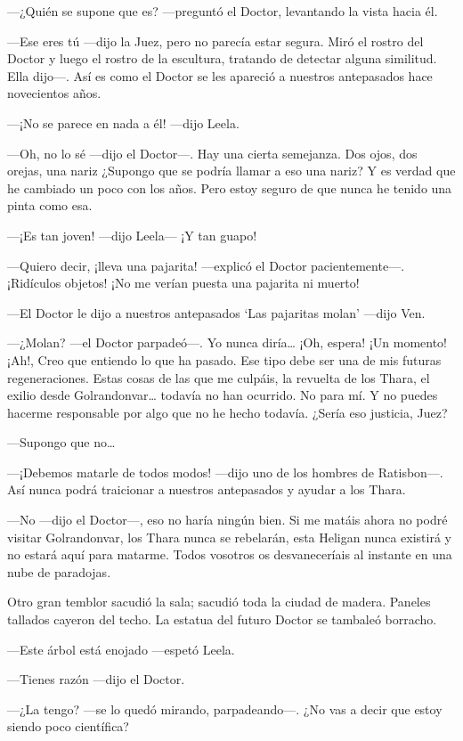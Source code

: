 ---¿Quién se supone que es? ---preguntó el Doctor, levantando la vista
hacia él.

---Ese eres tú ---dijo la Juez, pero no parecía estar segura. Miró el
rostro del Doctor y luego el rostro de la escultura, tratando de
detectar alguna similitud. Ella dijo---. Así es como el Doctor se les
apareció a nuestros antepasados hace novecientos años.

---¡No se parece en nada a él! ---dijo Leela.

---Oh, no lo sé ---dijo el Doctor---. Hay una cierta semejanza. Dos
ojos, dos orejas, una nariz ¿Supongo que se podría llamar a eso una
nariz? Y es verdad que he cambiado un poco con los años. Pero estoy
seguro de que nunca he tenido una pinta como esa.

---¡Es tan joven! ---dijo Leela--- ¡Y tan guapo!

---Quiero decir, ¡lleva una pajarita! ---explicó el Doctor
pacientemente---. ¡Ridículos objetos! ¡No me verían puesta una pajarita
ni muerto!

---El Doctor le dijo a nuestros antepasados `Las pajaritas molan'
---dijo Ven.

---¿Molan? ---el Doctor parpadeó---. Yo nunca diría\ldots{} ¡Oh, espera!
¡Un momento! ¡Ah!, Creo que entiendo lo que ha pasado. Ese tipo debe ser
una de mis futuras regeneraciones. Estas cosas de las que me culpáis, la
revuelta de los Thara, el exilio desde Golrandonvar\ldots{} todavía no
han ocurrido. No para mí. Y no puedes hacerme responsable por algo que
no he hecho todavía. ¿Sería eso justicia, Juez?

---Supongo que no\ldots{}

---¡Debemos matarle de todos modos! ---dijo uno de los hombres de
Ratisbon---. Así nunca podrá traicionar a nuestros antepasados y
ayudar a los Thara.

---No ---dijo el Doctor---, eso no haría ningún bien. Si me matáis ahora
no podré visitar Golrandonvar, los Thara nunca se rebelarán, esta
Heligan nunca existirá y no estará aquí para matarme. Todos vosotros os
desvaneceríais al instante en una nube de paradojas.

Otro gran temblor sacudió la sala; sacudió toda la ciudad de madera.
Paneles tallados cayeron del techo. La estatua del futuro Doctor se
tambaleó borracho.

---Este árbol está enojado ---espetó Leela.

---Tienes razón ---dijo el Doctor.

---¿La tengo? ---se lo quedó mirando, parpadeando---. ¿No vas a decir
que estoy siendo poco científica?

